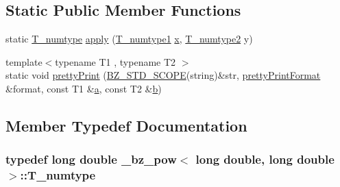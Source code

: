 \subsection*{Static Public Member Functions}
\begin{DoxyCompactItemize}
\item 
static \hyperlink{class__bz__pow_3_01long_01double_00_01long_01double_01_4_af5c386bda6a4f5646f01359d28a6bfea}{T\+\_\+numtype} \hyperlink{class__bz__pow_3_01long_01double_00_01long_01double_01_4_a23ed5fcf311b3cccce3c1eb6dcec544a}{apply} (\hyperlink{class__bz__pow_3_01long_01double_00_01long_01double_01_4_a08e475617b5ab32a13afb6ff9eb2fd62}{T\+\_\+numtype1} \hyperlink{vecnorm1_8cc_ac73eed9e41ec09d58f112f06c2d6cb63}{x}, \hyperlink{class__bz__pow_3_01long_01double_00_01long_01double_01_4_a788ee2955435e2af89084de921be826b}{T\+\_\+numtype2} y)
\item 
{\footnotesize template$<$typename T1 , typename T2 $>$ }\\static void \hyperlink{class__bz__pow_3_01long_01double_00_01long_01double_01_4_a862a5252934d02919434fafcd4498e61}{pretty\+Print} (\hyperlink{numinquire_8h_a2b24ffc3b4ef9803956bc7715c6c7b83}{B\+Z\+\_\+\+S\+T\+D\+\_\+\+S\+C\+O\+P\+E}(string)\&str, \hyperlink{classprettyPrintFormat}{pretty\+Print\+Format} \&format, const T1 \&\hyperlink{gen__mat5files_8m_aae328bf20413f220e38aec4d95bfd6da}{a}, const T2 \&\hyperlink{gen__mat5files_8m_a7b38767b3b6a8dae167e5afa4fc340b0}{b})
\end{DoxyCompactItemize}


\subsection{Member Typedef Documentation}
\hypertarget{class__bz__pow_3_01long_01double_00_01long_01double_01_4_af5c386bda6a4f5646f01359d28a6bfea}{}
\subsubsection[{T\+\_\+numtype}]{\setlength{\rightskip}{0pt plus 5cm}typedef long double {\bf \+\_\+bz\+\_\+pow}$<$ long double, long double $>$\+::{\bf T\+\_\+numtype}}\label{class__bz__pow_3_01long_01double_00_01long_01double_01_4_af5c386bda6a4f5646f01359d28a6bfea}
\hypertarget{class__bz__pow_3_01long_01double_00_01long_01double_01_4_a08e475617b5ab32a13afb6ff9eb2fd62}{}
